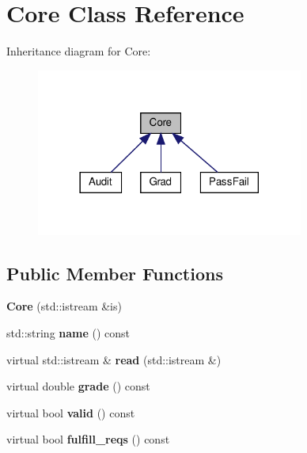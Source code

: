 \hypertarget{classCore}{}\section{Core Class Reference}
\label{classCore}


Inheritance diagram for Core\+:
\nopagebreak
\begin{figure}[H]
\begin{center}
\leavevmode
\includegraphics[width=249pt]{classCore__inherit__graph}
\end{center}
\end{figure}
\subsection*{Public Member Functions}
\begin{DoxyCompactItemize}
\item 
\mbox{\label{classCore_ad1013e09510ddff40c114943de99093f}} 
{\bfseries Core} (std\+::istream \&is)
\item 
\mbox{\label{classCore_a60d51fbac9805972bac7b117af8f1a54}} 
std\+::string {\bfseries name} () const
\item 
\mbox{\label{classCore_ae3bbc66cb3733082f8537d438c0521d6}} 
virtual std\+::istream \& {\bfseries read} (std\+::istream \&)
\item 
\mbox{\label{classCore_a0d609cb4037c6dfe99ce0d68c1d69f04}} 
virtual double {\bfseries grade} () const
\item 
\mbox{\label{classCore_a557816073236f9ed9fa91edbb9cea451}} 
virtual bool {\bfseries valid} () const
\item 
\mbox{\label{classCore_a81f50dc6932b75f6dbd7c9014bf23644}} 
virtual bool {\bfseries fulfill\+\_\+reqs} () const
\end{DoxyCompactItemize}
